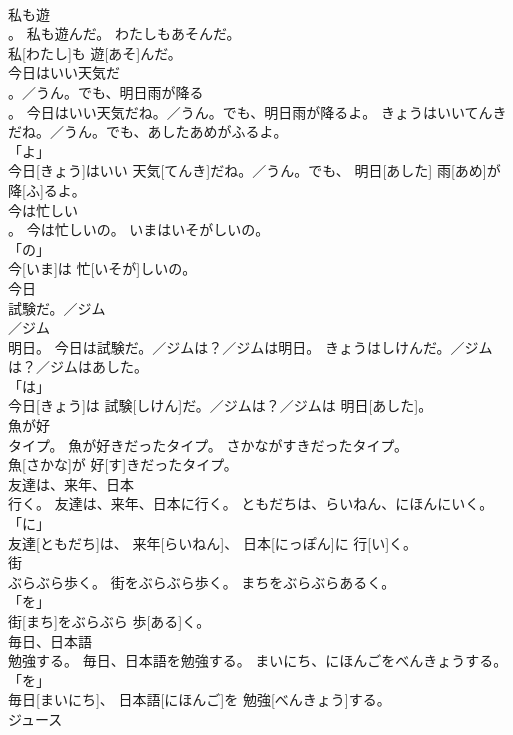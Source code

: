 \documentclass[8pt]{extreport}
\begin{document}
\begin{CJK}{UTF8}{min}
\\	私も遊
\\	。	私も遊んだ。	わたしもあそんだ。	
\\	私[わたし]も 遊[あそ]んだ。		
\\	今日はいい天気だ
\\	。／うん。でも、明日雨が降る
\\	。	今日はいい天気だね。／うん。でも、明日雨が降るよ。	きょうはいいてんきだね。／うん。でも、あしたあめがふるよ。	
\\	「よ」 
\\	今日[きょう]はいい 天気[てんき]だね。／うん。でも、 明日[あした] 雨[あめ]が 降[ふ]るよ。		
\\	今は忙しい
\\	。	今は忙しいの。	いまはいそがしいの。	
\\	「の」 
\\	今[いま]は 忙[いそが]しいの。		
\\	今日
\\	試験だ。／ジム
\\	／ジム
\\	明日。	今日は試験だ。／ジムは？／ジムは明日。	きょうはしけんだ。／ジムは？／ジムはあした。	
\\	「は」 
\\	今日[きょう]は 試験[しけん]だ。／ジムは？／ジムは 明日[あした]。		
\\	魚が好
\\	タイプ。	魚が好きだったタイプ。	さかながすきだったタイプ。	
\\	魚[さかな]が 好[す]きだったタイプ。		
\\	友達は、来年、日本
\\	行く。	友達は、来年、日本に行く。	ともだちは、らいねん、にほんにいく。	
\\	「に」 
\\	友達[ともだち]は、 来年[らいねん]、 日本[にっぽん]に 行[い]く。		
\\	街
\\	ぶらぶら歩く。	街をぶらぶら歩く。	まちをぶらぶらあるく。	
\\	「を」 
\\	街[まち]をぶらぶら 歩[ある]く。		
\\	毎日、日本語
\\	勉強する。	毎日、日本語を勉強する。	まいにち、にほんごをべんきょうする。	
\\	「を」 
\\	毎日[まいにち]、 日本語[にほんご]を 勉強[べんきょう]する。		
\\	ジュース

\end{CJK}
\end{document}
